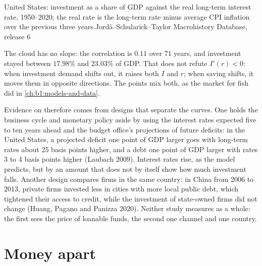 \begin{omchart}{United States: investment as a share of GDP against the real
long-term interest rate, 1950--2020; the real rate is the long-term rate
minus average CPI inflation over the previous three years.}{Jordà--Schularick--Taylor
Macrohistory Database, release 6}
\end{omchart}

The cloud has no slope: the correlation is $0.11$ over 71 years, and
investment stayed between $17.98\%$ and $23.03\%$ of GDP. %
That does not refute $I'(r) < 0$: when investment demand shifts out, it raises
both $I$ and $r$; when saving shifts, it moves them in opposite directions.
The points mix both, as the market for fish did in \cref{ch:b1:models-and-data}.

Evidence on  therefore comes from designs that separate the
curves. One holds the business cycle and monetary policy aside by using
the interest rates expected five to ten years ahead and the budget office's
projections of future deficits: in the United States, a projected deficit
one point of GDP larger goes with long-term rates about 25 basis points
higher, and a debt one point of GDP larger with rates 3 to 4 basis points
higher (Laubach 2009). %
Interest rates rise, as the model predicts, but by an amount that does not
by itself show how much investment falls. Another design compares firms in
the same country: in China from 2006 to 2013, private firms invested less in
cities with more local public debt, which tightened their access to credit,
while the investment of state-owned firms did not change (Huang, Pagano and
Panizza 2020). %
Neither study measures  as a whole: the first sees the price of
loanable funds, the second one channel and one country.

\section{Money apart}\label{sec:b1:long-run-model:money}

